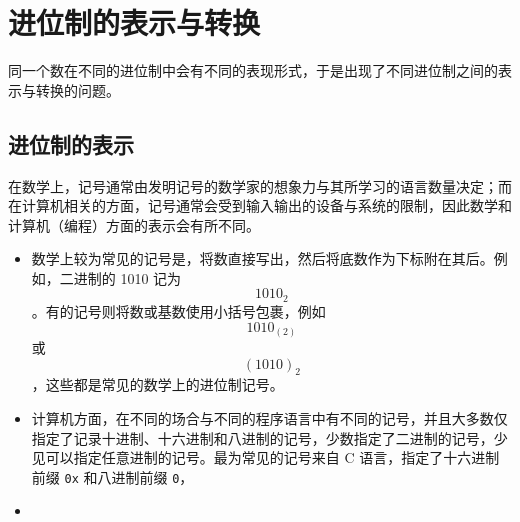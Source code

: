 \section{进位制的表示与转换}\label{sec:ArithBasics/positional-notation-presentation-and-conversion}
    同一个数在不同的进位制中会有不同的表现形式，于是出现了不同进位制之间的表示与转换的问题。
    \subsection{进位制的表示}\label{subsec:ArithBasics/positional-notation-presentation-and-conversion/presentation}
        在数学上，记号通常由发明记号的数学家的想象力与其所学习的语言数量决定；而在计算机相关的方面，记号通常会受到输入输出的设备与系统的限制，因此数学和计算机（编程）方面的表示会有所不同。
        \begin{itemize}
            \item 数学上较为常见的记号是，将数直接写出，然后将底数作为下标附在其后。例如，二进制的 1010 记为\[1010_2\]。有的记号则将数或基数使用小括号包裹，例如\[1010_{(2)}\]或\[(1010)_2\]，这些都是常见的数学上的进位制记号。
            \item 计算机方面，在不同的场合与不同的程序语言中有不同的记号，并且大多数仅指定了记录十进制、十六进制和八进制的记号，少数指定了二进制的记号，少见可以指定任意进制的记号。最为常见的记号来自 C 语言，指定了十六进制前缀 \texttt{0x} 和八进制前缀 \texttt{0}，
            \item
        \end{itemize}
